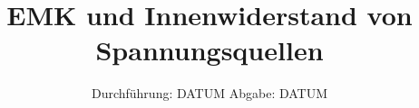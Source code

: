 

\subject{V301}
\title{EMK und Innenwiderstand von Spannungsquellen}
\date{
	Durchführung: DATUM
	\hspace{4em}
	Abgabe: DATUM
}


	\maketitle
	\newpage
	\tableofcontents
	\newpage
	
	
	
	\newpage
	
	
	\newpage
	
	\printbibliography

